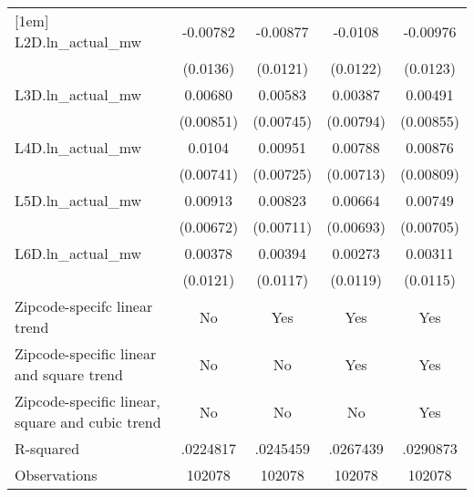 {\begin{tabular}{l*{4}{c}}
[1em]
L2D.ln\_actual\_mw& -0.00782         & -0.00877         &  -0.0108         & -0.00976         \\
          & (0.0136)         & (0.0121)         & (0.0122)         & (0.0123)         \\
[1em]
L3D.ln\_actual\_mw&  0.00680         &  0.00583         &  0.00387         &  0.00491         \\
          &(0.00851)         &(0.00745)         &(0.00794)         &(0.00855)         \\
[1em]
L4D.ln\_actual\_mw&   0.0104         &  0.00951         &  0.00788         &  0.00876         \\
          &(0.00741)         &(0.00725)         &(0.00713)         &(0.00809)         \\
[1em]
L5D.ln\_actual\_mw&  0.00913         &  0.00823         &  0.00664         &  0.00749         \\
          &(0.00672)         &(0.00711)         &(0.00693)         &(0.00705)         \\
[1em]
L6D.ln\_actual\_mw&  0.00378         &  0.00394         &  0.00273         &  0.00311         \\
          & (0.0121)         & (0.0117)         & (0.0119)         & (0.0115)         \\
\hline
Zipcode-specifc linear trend&       No         &      Yes         &      Yes         &      Yes         \\
Zipcode-specific linear and square trend&       No         &       No         &      Yes         &      Yes         \\
Zipcode-specific linear, square and cubic trend&       No         &       No         &       No         &      Yes         \\
R-squared & .0224817         & .0245459         & .0267439         & .0290873         \\
Observations&   102078         &   102078         &   102078         &   102078         \\
\hline\hline
\end{tabular}
}
